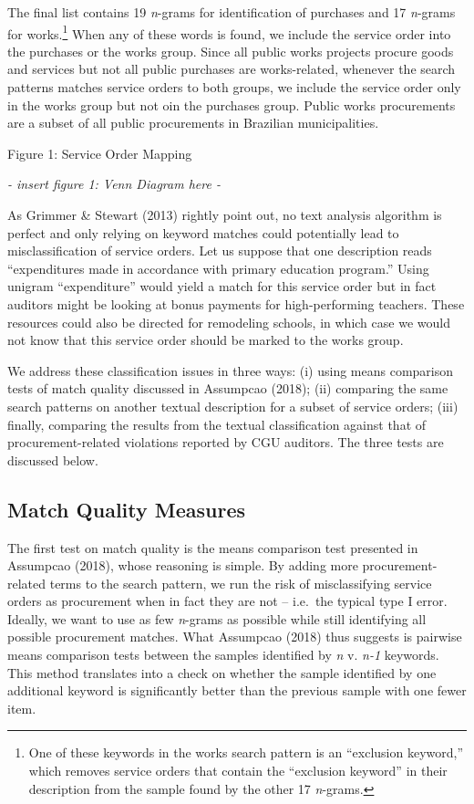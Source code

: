 \documentclass[]{article}
\let\rmarkdownfootnote\footnote%
\def\footnote{\protect\rmarkdownfootnote}
\theoremstyle{definition}
\theoremstyle{definition}
\theoremstyle{definition}
\theoremstyle{remark}
\begin{document}
The final list contains 19 \emph{n}-grams for identification of
purchases and 17 \emph{n}-grams for works.\footnote{One of these
  keywords in the works search pattern is an ``exclusion keyword,''
  which removes service orders that contain the ``exclusion keyword'' in
  their description from the sample found by the other 17
  \emph{n}-grams.} When any of these words is found, we include the
service order into the purchases or the works group. Since all public
works projects procure goods and services but not all public purchases
are works-related, whenever the search patterns matches service orders
to both groups, we include the service order only in the works group but
not oin the purchases group. Public works procurements are a subset of
all public procurements in Brazilian municipalities.

Figure 1: Service Order Mapping

\emph{- insert figure 1: Venn Diagram here -}

As Grimmer \& Stewart (2013) rightly point out, no text analysis
algorithm is perfect and only relying on keyword matches could
potentially lead to misclassification of service orders. Let us suppose
that one description reads ``expenditures made in accordance with
primary education program.'' Using unigram ``expenditure'' would yield a
match for this service order but in fact auditors might be looking at
bonus payments for high-performing teachers. These resources could also
be directed for remodeling schools, in which case we would not know that
this service order should be marked to the works group.

We address these classification issues in three ways: (i) using means
comparison tests of match quality discussed in Assumpcao (2018); (ii)
comparing the same search patterns on another textual description for a
subset of service orders; (iii) finally, comparing the results from the
textual classification against that of procurement-related violations
reported by CGU auditors. The three tests are discussed below.

\hypertarget{quality1}{%
\subsection{Match Quality Measures}\label{quality1}}

The first test on match quality is the means comparison test presented
in Assumpcao (2018), whose reasoning is simple. By adding more
procurement-related terms to the search pattern, we run the risk of
misclassifying service orders as procurement when in fact they are not
-- i.e.~the typical type I error. Ideally, we want to use as few
\emph{n}-grams as possible while still identifying all possible
procurement matches. What Assumpcao (2018) thus suggests is pairwise
means comparison tests between the samples identified by \emph{n} v.
\emph{n-1} keywords. This method translates into a check on whether the
sample identified by one additional keyword is significantly better than
the previous sample with one fewer item.
\end{document}
